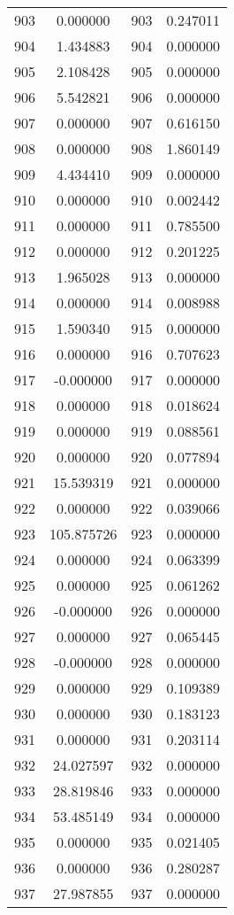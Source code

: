 \documentclass[12pt]{article}
\begin{document}
\begin{longtable}{@{}cccc@{}}
903 & 0.000000 & 903 & 0.247011 \\
904 & 1.434883 & 904 & 0.000000 \\
905 & 2.108428 & 905 & 0.000000 \\
906 & 5.542821 & 906 & 0.000000 \\
907 & 0.000000 & 907 & 0.616150 \\
908 & 0.000000 & 908 & 1.860149 \\
909 & 4.434410 & 909 & 0.000000 \\
910 & 0.000000 & 910 & 0.002442 \\
911 & 0.000000 & 911 & 0.785500 \\
912 & 0.000000 & 912 & 0.201225 \\
913 & 1.965028 & 913 & 0.000000 \\
914 & 0.000000 & 914 & 0.008988 \\
915 & 1.590340 & 915 & 0.000000 \\
916 & 0.000000 & 916 & 0.707623 \\
917 & -0.000000 & 917 & 0.000000 \\
918 & 0.000000 & 918 & 0.018624 \\
919 & 0.000000 & 919 & 0.088561 \\
920 & 0.000000 & 920 & 0.077894 \\
921 & 15.539319 & 921 & 0.000000 \\
922 & 0.000000 & 922 & 0.039066 \\
923 & 105.875726 & 923 & 0.000000 \\
924 & 0.000000 & 924 & 0.063399 \\
925 & 0.000000 & 925 & 0.061262 \\
926 & -0.000000 & 926 & 0.000000 \\
927 & 0.000000 & 927 & 0.065445 \\
928 & -0.000000 & 928 & 0.000000 \\
929 & 0.000000 & 929 & 0.109389 \\
930 & 0.000000 & 930 & 0.183123 \\
931 & 0.000000 & 931 & 0.203114 \\
932 & 24.027597 & 932 & 0.000000 \\
933 & 28.819846 & 933 & 0.000000 \\
934 & 53.485149 & 934 & 0.000000 \\
935 & 0.000000 & 935 & 0.021405 \\
936 & 0.000000 & 936 & 0.280287 \\
937 & 27.987855 & 937 & 0.000000 \\

\end{longtable}
\end{document}
